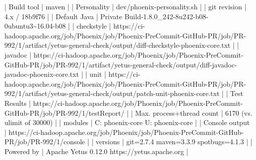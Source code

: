 \documentclass{report}%
\begin{document}
\begin{enumerate}
\newline%
   | Build tool | maven |\newline%
\newline%
   | Personality | dev/phoenix{-}personality.sh |\newline%
\newline%
   | git revision | 4.x / 18b9f76 |\newline%
\newline%
   | Default Java | Private Build{-}1.8.0\_242{-}8u242{-}b08{-}0ubuntu3\textasciitilde{}16.04{-}b08 |\newline%
\newline%
   | checkstyle | https://ci{-}hadoop.apache.org/job/Phoenix/job/Phoenix{-}PreCommit{-}GitHub{-}PR/job/PR{-}992/1/artifact/yetus{-}general{-}check/output/diff{-}checkstyle{-}phoenix{-}core.txt |\newline%
\newline%
   | javadoc | https://ci{-}hadoop.apache.org/job/Phoenix/job/Phoenix{-}PreCommit{-}GitHub{-}PR/job/PR{-}992/1/artifact/yetus{-}general{-}check/output/diff{-}javadoc{-}javadoc{-}phoenix{-}core.txt |\newline%
\newline%
   | unit | https://ci{-}hadoop.apache.org/job/Phoenix/job/Phoenix{-}PreCommit{-}GitHub{-}PR/job/PR{-}992/1/artifact/yetus{-}general{-}check/output/patch{-}unit{-}phoenix{-}core.txt |\newline%
\newline%
   |  Test Results | https://ci{-}hadoop.apache.org/job/Phoenix/job/Phoenix{-}PreCommit{-}GitHub{-}PR/job/PR{-}992/1/testReport/ |\newline%
\newline%
   | Max. process+thread count | 6170 (vs. ulimit of 30000) |\newline%
\newline%
   | modules | C: phoenix{-}core U: phoenix{-}core |\newline%
\newline%
   | Console output | https://ci{-}hadoop.apache.org/job/Phoenix/job/Phoenix{-}PreCommit{-}GitHub{-}PR/job/PR{-}992/1/console |\newline%
\newline%
   | versions | git=2.7.4 maven=3.3.9 spotbugs=4.1.3 |\newline%
\newline%
   | Powered by | Apache Yetus 0.12.0 https://yetus.apache.org |\newline%
\newline%

\end{enumerate}
\end{document}
